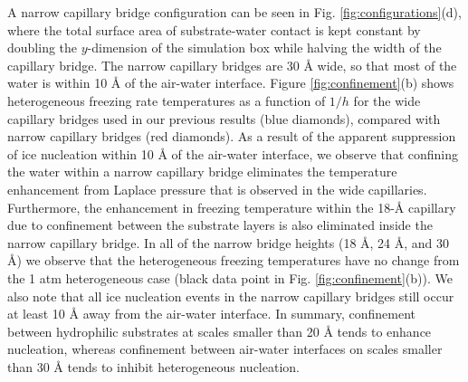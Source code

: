 \documentclass[journal abbreviation, manuscript]{copernicus}
\providecommand{\DIFaddend}{} %
\begin{document}
\DIFaddend A narrow capillary bridge configuration can be seen in Fig. \ref{fig:configurations}(d), where the total surface area of substrate-water contact is kept constant by doubling the $y$-dimension of the simulation box while halving the width of the capillary bridge. The narrow capillary bridges are 30 \AA{} wide, so that most of the water is within 10 \AA{} of the air-water interface. Figure \ref{fig:confinement}(b) shows heterogeneous freezing rate temperatures as a function of $1/h$ for the wide capillary bridges used in our previous results (blue diamonds), compared with narrow capillary bridges (red diamonds). As a result of the apparent suppression of ice nucleation within 10 \AA{} of the air-water interface, we observe that confining the water within a narrow capillary bridge eliminates the temperature enhancement from Laplace pressure that is observed in the wide capillaries. Furthermore, the enhancement in freezing temperature within the 18-\AA{} capillary due to confinement between the substrate layers is also eliminated inside the narrow capillary bridge. In all of the narrow bridge heights (18 \AA{}, 24 \AA{}, and 30 \AA{}) we observe that the heterogeneous freezing temperatures have no change from the 1 atm heterogeneous case (black data point in Fig. \ref{fig:confinement}(b)). We also note that all ice nucleation events in the narrow capillary bridges still occur at least 10 \AA{} away from the air-water interface. In summary, confinement between hydrophilic substrates at scales smaller than 20 \AA{} tends to enhance nucleation, whereas confinement between air-water interfaces on scales smaller than 30 \AA{} tends to inhibit heterogeneous nucleation.
\end{document}
